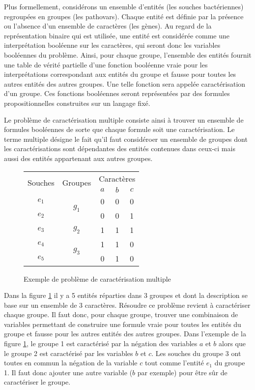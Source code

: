 Plus formellement, considérons un ensemble d'entités (les souches bactériennes) regroupées en groupes (les pathovars). Chaque entité est définie par la présence ou l'absence d'un ensemble de caractères (les gènes). Au regard de la représentation binaire qui est utilisée, une entité est considérée comme une interprétation booléenne sur les caractères, qui seront donc les variables booléennes du problème. Ainsi, pour chaque groupe, l'ensemble des entités fournit une table de vérité partielle d'une fonction booléenne vraie pour les interprétations correspondant aux entités du groupe et fausse pour toutes les autres entités des autres groupes. Une telle fonction sera appelée caractérisation d'un groupe. Ces fonctions booléennes seront représentées par des formules propositionnelles construites sur un langage fixé.



Le problème de caractérisation multiple consiste ainsi à trouver un ensemble de
formules booléennes de sorte que chaque formule soit une caractérisation. Le terme
multiple désigne le fait qu'il faut considéroer un ensemble de groupes dont les
caractérisations sont dépendantes des entités contenues dans ceux-ci mais aussi
des entités appartenant aux autres groupes.

\begin{figure}[H]
\begin{center}
\begin{tabular}{|c||c|c|c|c|}
\hline
\multirow{2}{*}{Souches}&\multirow{2}{*}{Groupes}&\multicolumn{3}{c|}{Caractères
}\\
&&$a$&$b$&$c$\\
\hline
\hline
$e_1$&\multirow{2}{*}{$g_1$}&\cellcolor{lightgray}0&\cellcolor{lightgray}0&0\\
\cline{1-1} \cline{3-5}
$e_2$&&\cellcolor{lightgray}0& \cellcolor{lightgray}0&1\\
\hline
\hline
$e_3$&$g_2$&1&\cellcolor{lightgray}1&\cellcolor{lightgray}1\\
\hline
\hline
$e_4$&\multirow{2}{*}{$g_3$}&1&\cellcolor{lightgray}1&\cellcolor{lightgray}0\\
\cline{1-1} \cline{3-5}
$e_5$&&0&\cellcolor{lightgray}1&\cellcolor{lightgray}0\\
\hline
\end{tabular}
\end{center}
\caption{Exemple de problème de caractérisation multiple}
\label{CD}
\end{figure}

Dans la figure \ref{CD} il y a 5 entités réparties dans 3 groupes et dont
la description se base sur un ensemble de 3 caractères.
Résoudre ce problème revient à caractériser chaque groupe. Il faut donc, pour
chaque groupe, trouver une combinaison de  variables permettant de construire une formule vraie pour toutes les
entités du groupe et fausse pour les autres entités des autres
groupes. Dans l'exemple de la figure \ref{CD}, le groupe 1 est caractérisé par
la négation des variables $a$ et $b$  alors que le groupe 2 est caractérisé par
les variables $b$ et $c$. Les souches du groupe 3 ont toutes en commun la
négation de la variable $c$ tout comme l'entité $e_1$ du groupe 1. Il faut donc
ajouter une autre variable ($b$ par exemple) pour être sûr de caractériser le
groupe.
